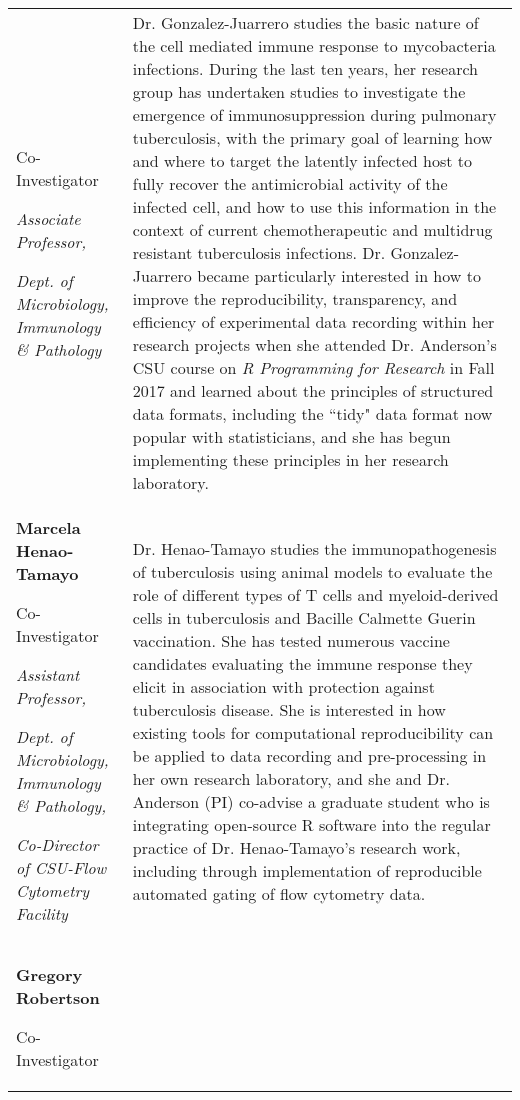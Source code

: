 \begin{table}[!h]
{\begin{tabular}[t]{>{\raggedright\arraybackslash}p{14em}>{\raggedright\arraybackslash}p{45em}}
  Co-Investigator
  
  \textit{Associate Professor,}
  
  \textit{Dept. of Microbiology, Immunology \& Pathology} & Dr. Gonzalez-Juarrero studies the basic nature of the
  cell mediated immune response to mycobacteria infections. During the last ten
  years, her research group has undertaken studies to investigate the emergence of
  immunosuppression during pulmonary tuberculosis, with the primary goal of
  learning how and where to target the latently infected host to fully recover the
  antimicrobial activity of the infected cell, and how to use this information in
  the context of current chemotherapeutic and multidrug resistant tuberculosis infections.
  Dr. Gonzalez-Juarrero became particularly interested in how to improve the
  reproducibility, transparency, and efficiency of experimental data recording
  within her research projects when she attended Dr. Anderson's CSU course on
  \textit{R Programming for Research} in Fall 2017 and learned about the
  principles of structured data formats, including the ``tidy" data format now
  popular with statisticians, and she has begun implementing these principles in her research laboratory.\\
\textbf{Marcela Henao-Tamayo}
  
  Co-Investigator
  
  \textit{Assistant Professor,}
  
  \textit{Dept. of Microbiology, Immunology \& Pathology,}
  
  \textit{Co-Director of CSU-Flow Cytometry Facility} & Dr. Henao-Tamayo studies the immunopathogenesis of
  tuberculosis using animal models to evaluate the role of different types of T
  cells and myeloid-derived cells in tuberculosis and Bacille
  Calmette Guerin vaccination. She has tested numerous
  vaccine candidates evaluating the immune response they elicit in association
  with protection against tuberculosis disease. She is interested in how existing
  tools for computational reproducibility can be applied to data recording and
  pre-processing in her own research laboratory, and she and Dr. Anderson (PI)
  co-advise a graduate student who is integrating open-source R software into the
  regular practice of Dr. Henao-Tamayo's research work, including through
  implementation of reproducible automated gating of flow cytometry data.\\
\textbf{Gregory Robertson}
  
  Co-Investigator
  

\end{tabular}}
\end{table}
